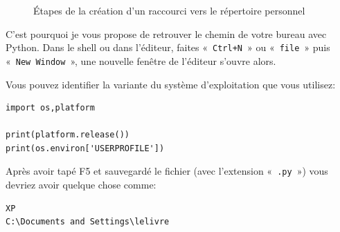 \begin{figure}[H]
{\label{fig:comptera}
}

\caption{Étapes de la création d'un raccourci vers le répertoire personnel}
\label{fig:etapesra}
\end{figure}


C'est pourquoi je vous propose de retrouver le chemin de votre bureau avec Python.
Dans le shell ou dans l'éditeur, faites « \texttt{Ctrl+N} » ou « \texttt{file} » puis   
« \texttt{New Window} », une nouvelle fenêtre de l'éditeur s'ouvre alors.

Vous pouvez identifier la variante du système d'exploitation que vous utilisez:
\begin{Verbatim}[frame=single,rulecolor=\color{mbleu}, label=à taper]
import os,platform

print(platform.release())
print(os.environ['USERPROFILE'])
\end{Verbatim}

Après avoir tapé F5 et sauvegardé le fichier (avec l'extension « \texttt{.py} »)  vous devriez avoir quelque chose comme:

\begin{Verbatim}[frame=single,rulecolor=\color{gray}, label=résultat]
XP
C:\Documents and Settings\lelivre
\end{Verbatim}

